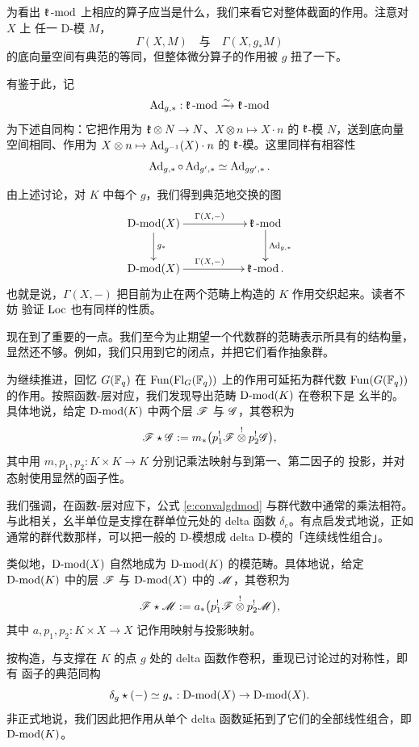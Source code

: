 为看出 $\mathfrak{k}\operatorname{-mod}$ 上相应的算子应当是什么，我们来看它对整体截面的作用。注意对 $X$ 上
任一 D-模 $M$，
%
\[
   \Gamma(X, M) \quad \text{与} \quad \Gamma(X, g_* M)
\]
%
的底向量空间有典范的等同，但整体微分算子的作用被 $g$ 扭了一下。

有鉴于此，记
%
\[
       \operatorname{Ad}_{g, *}: \mathfrak{k}\operatorname{-mod} \xrightarrow{\sim} \mathfrak{k}\operatorname{-mod}
\]
%
为下述自同构：它把作用为 $\mathfrak{k} \otimes N \rightarrow N$、$X \otimes n \mapsto X
\cdot n$ 的 $\mathfrak{k}$-模 $N$，送到底向量空间相同、作用为 $X \otimes n \mapsto
\operatorname{Ad}_{g^{-1}}(X) \cdot n$ 的 $\mathfrak{k}$-模。这里同样有相容性
%
\[
   \operatorname{Ad}_{g, *} \circ \operatorname{Ad}_{g', *} \simeq \operatorname{Ad}_{gg', *}.
\]
%

\ssszh 由上述讨论，对 $K$ 中每个 $g$，我们得到典范地交换的图
%
\[
\xymatrix{\Dmod(X) \ar[d]^{g_*} \ar[rr]^{\Gamma(X, -)} && \fk\mod
\ar[d]^{\on{Ad}_{g, *}} \\ \Dmod(X) \ar[rr]^{\Gamma(X, -)} & &
\fk\mod. }
\]
%
也就是说，$\Gamma(X, -)$ 把目前为止在两个范畴上构造的 $K$ 作用交织起来。读者不妨
验证 $\operatorname{Loc}$ 也有同样的性质。

\ssszh 现在到了重要的一点。我们至今为止期望一个代数群的范畴表示所具有的结构量，
显然还不够。例如，我们只用到它的闭点，并把它们看作抽象群。

为继续推进，回忆 $G(\mathbb{F}_q)$ 在 $\operatorname{Fun}(\operatorname{Fl}_G(\mathbb{F}_q))$ 上的作用可延拓为群代数
$\operatorname{Fun}(G(\mathbb{F}_q))$ 的作用。按照函数-层对应，我们发现导出范畴 $\operatorname{D-mod}(K)$ 在卷积下是
幺半的。具体地说，给定 $\operatorname{D-mod}(K)$ 中两个层 $\mathscr{F}$ 与 $\mathscr{G}$，其卷积为
%
\begin{equation} \label{e:convalgdmod}
  \mathscr{F} \star \mathscr{G} := m_*\big( p_1^! \mathscr{F} \overset{!}{\otimes} p_2^! \mathscr{G} \big),
\end{equation}
%
其中用 $m, p_1, p_2: K \times K \rightarrow K$ 分别记乘法映射与到第一、第二因子的
投影，并对态射使用显然的函子性。

我们强调，在函数-层对应下，公式 \eqref{e:convalgdmod} 与群代数中通常的乘法相符。
与此相关，幺半单位是支撑在群单位元处的 delta 函数 $\delta_e$。有点启发式地说，正如
通常的群代数那样，可以把一般的 D-模想成 delta D-模的「连续线性组合」。

类似地，$\operatorname{D-mod}(X)$ 自然地成为 $\operatorname{D-mod}(K)$ 的模范畴。具体地说，给定
$\operatorname{D-mod}(K)$ 中的层 $\mathscr{F}$ 与 $\operatorname{D-mod}(X)$ 中的 $\mathscr{M}$，其卷积为
%
\begin{equation} \label{e:conv}
     \mathscr{F} \star \mathscr{M} := a_*\big( p_1^! \mathscr{F} \overset{!}{\otimes} p_2^! \mathscr{M}\big),
\end{equation}
%
其中 $a, p_1, p_2: K \times X \rightarrow X$ 记作用映射与投影映射。

按构造，与支撑在 $K$ 的点 $g$ 处的 delta 函数作卷积，重现已讨论过的对称性，即有
函子的典范同构
%
\begin{equation}
\label{e:action}
 \delta_g \star (-) \simeq g_*: \operatorname{D-mod}(X) \rightarrow \operatorname{D-mod}(X).
\end{equation}
%
非正式地说，我们因此把作用从单个 delta 函数延拓到了它们的全部线性组合，即
$\operatorname{D-mod}(K)$。

